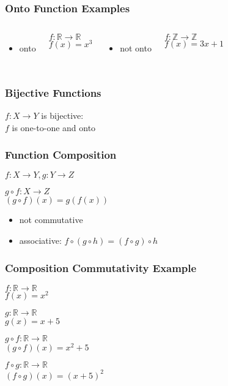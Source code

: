 \documentclass[dvipsnames]{beamer}
\begin{document}
\begin{frame}
  \frametitle{Onto Function Examples}

  \begin{columns}[t]
    \begin{itemize}
     \item onto
    \end{itemize}

    \medskip
    $f: \mathbb{R} \rightarrow \mathbb{R}$\\
    $f(x) = x^3$

    \pause
    \begin{itemize}
     \item not onto
    \end{itemize}

    \medskip
    $f: \mathbb{Z} \rightarrow \mathbb{Z}$\\
    $f(x) = 3x + 1$
  \end{columns}
\end{frame}

\begin{frame}
  \frametitle{Bijective Functions}

  \begin{definition}
    $f: X \rightarrow Y$ is \alert{bijective}:\\
    $f$ is one-to-one and onto
  \end{definition}
\end{frame}

\begin{frame}
  \frametitle{Function Composition}

  \begin{definition}
    $f: X \rightarrow Y, g: Y \rightarrow Z$

    \medskip
    $g \circ f: X \rightarrow Z$\\
    $(g \circ f)(x) = g(f(x))$
  \end{definition}

  \pause
  \begin{itemize}
    \item not commutative
    \item associative: $f \circ (g \circ h) = (f \circ g) \circ h$
  \end{itemize}
\end{frame}

\begin{frame}
  \frametitle{Composition Commutativity Example}

  $f: \mathbb{R} \rightarrow \mathbb{R}$\\
  $f(x) = x^2$

  \medskip
  $g: \mathbb{R} \rightarrow \mathbb{R}$\\
  $g(x) = x + 5$

  \pause
  \bigskip
  $g \circ f: \mathbb{R} \rightarrow \mathbb{R}$\\
  $(g \circ f)(x) = x^2 + 5$

  \pause
  \medskip
  $f \circ g: \mathbb{R} \rightarrow \mathbb{R}$\\
  $(f \circ g)(x) = (x + 5)^2$
\end{frame}
\end{document}
